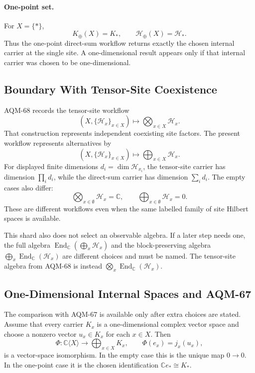 \paragraph{One-point set.}
For \(X=\{\ast\}\),
\[
  K_{\oplus}(X)=K_\ast,
  \qquad
  \mathcal H_{\oplus}(X)=\mathcal H_\ast .
\]
Thus the one-point direct-sum workflow returns exactly the chosen internal
carrier at the single site.  A one-dimensional result appears only if that
internal carrier was chosen to be one-dimensional.

\subsection{Boundary With Tensor-Site Coexistence}

AQM-68 records the tensor-site workflow
\[
  (X,\{\mathcal H_x\}_{x\in X})
  \longmapsto
  \bigotimes_{x\in X}\mathcal H_x .
\]
That construction represents independent coexisting site factors.  The present
workflow represents alternatives by
\[
  (X,\{\mathcal H_x\}_{x\in X})
  \longmapsto
  \bigoplus_{x\in X}\mathcal H_x .
\]
For displayed finite dimensions \(d_i=\dim\mathcal H_{x_i}\), the tensor-site
carrier has dimension \(\prod_i d_i\), while the direct-sum carrier has
dimension \(\sum_i d_i\).  The empty cases also differ:
\[
  \bigotimes_{x\in\emptyset}\mathcal H_x=\mathbb C,
  \qquad
  \bigoplus_{x\in\emptyset}\mathcal H_x=0.
\]
These are different workflows even when the same labelled family of site
Hilbert spaces is available.

This shard also does not select an observable algebra.  If a later step needs
one, the full algebra
\(\operatorname{End}_{\mathbb C}(\bigoplus_x\mathcal H_x)\) and the
block-preserving algebra \(\bigoplus_x\operatorname{End}_{\mathbb C}(\mathcal
H_x)\) are different choices and must be named.  The tensor-site algebra from
AQM-68 is instead \(\bigotimes_x\operatorname{End}_{\mathbb C}(\mathcal H_x)\).

\subsection{One-Dimensional Internal Spaces and AQM-67}

The comparison with AQM-67 is available only after extra choices are stated.
Assume that every carrier \(K_x\) is a one-dimensional complex vector space
and choose a nonzero vector \(u_x\in K_x\) for each \(x\in X\).  Then
\[
  \Phi:\mathbb C\langle X\rangle
  \longrightarrow
  \bigoplus_{x\in X}K_x,
  \qquad
  \Phi(e_x)=j_x(u_x),
\]
is a vector-space isomorphism.  In the empty case this is the unique map
\(0\to0\).  In the one-point case it is the chosen identification
\(\mathbb C e_\ast\cong K_\ast\).

